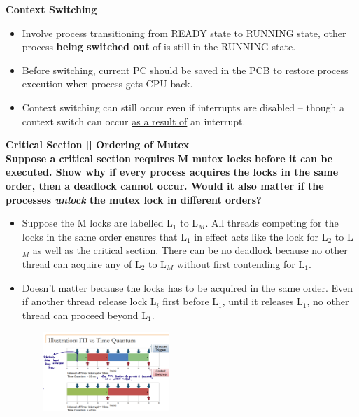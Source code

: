 \documentclass[10pt,landscape]{article}
\begin{document}
\begin{multicols*}{3}
\textbf{Context Switching}
\begin{itemize}[topsep=0pt,noitemsep,wide=0pt, leftmargin=\dimexpr{} + 2\relax]
    \item Involve process transitioning from READY state to RUNNING state, other process \textbf{being switched out} of is still in the RUNNING state.
    \item Before switching, current PC should be saved in the PCB to restore process execution when process gets CPU back.
    \item Context switching can still occur even if interrupts are disabled -- though a context switch can occur \underline{as a result of} an interrupt.
\end{itemize}

\textbf{Critical Section || Ordering of Mutex} \\ 
\textbf{Suppose a critical section requires M mutex locks before it can be executed.
Show why if every process acquires the locks in the same order, then a deadlock
cannot occur. Would it also matter if the processes \textit{unlock} the mutex lock in different orders?}

\begin{itemize}[topsep=0pt,noitemsep,wide=0pt, leftmargin=\dimexpr{} + 2\relax]
    \item Suppose the M locks are labelled L$_1$ to L$_M$. All threads competing for the locks in the same
    order ensures that L$_1$ in effect acts like the lock for L$_2$ to L$_M$ as well as the critical section.
    There can be no deadlock because no other thread can acquire any of L$_2$ to L$_M$ without first
    contending for L$_1$.
    \item Doesn’t matter because the locks has to be acquired in the same order. Even if another thread
    release lock L$_i$ first before L$_1$, until it releases L$_1$, no other thread can proceed beyond L$_1$. 
\end{itemize} 
\includegraphics*[width=7.6cm, height=3cm]{images/ititimequantum.png}


\end{multicols*}
\end{document}
